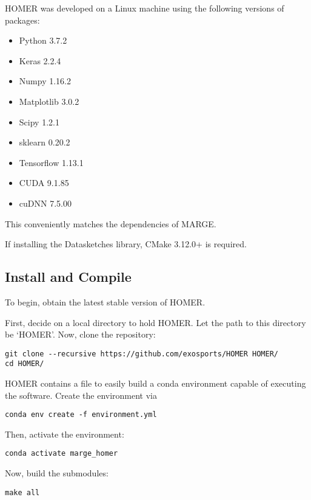 \documentclass[letterpaper, 12pt]{article}
\begin{document}
\noindent HOMER was developed on a Linux machine using the following 
versions of packages:

\begin{itemize}
\item Python 3.7.2
\item Keras 2.2.4
\item Numpy 1.16.2
\item Matplotlib 3.0.2
\item Scipy 1.2.1
\item sklearn 0.20.2
\item Tensorflow 1.13.1
\item CUDA 9.1.85
\item cuDNN 7.5.00
\end{itemize}

\noindent This conveniently matches the dependencies of MARGE.

\noindent If installing the Datasketches library, CMake 3.12.0+ is required.



\subsection{Install and Compile}
\label{sec:install}

\noindent To begin, obtain the latest stable version of HOMER.  

\noindent First, decide on a local directory to hold HOMER.  Let the path to this directory 
be `HOMER'.  Now, clone the repository:
\begin{verbatim}
git clone --recursive https://github.com/exosports/HOMER HOMER/
cd HOMER/
\end{verbatim}

\noindent HOMER contains a file to easily build a conda environment capable of 
executing the software.  Create the environment via

\begin{verbatim}
conda env create -f environment.yml
\end{verbatim}

\noindent Then, activate the environment:

\begin{verbatim}
conda activate marge_homer
\end{verbatim}

\noindent Now, build the submodules:

\begin{verbatim}
make all
\end{verbatim}
\end{document}
